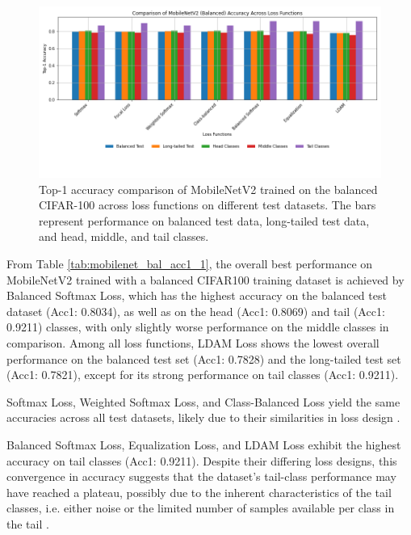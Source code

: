 \begin{figure}[h!]
    \centering
    \includegraphics[width=\textwidth]{Images/Plots/mobilenet_bal_loss_comparison.png}
    \caption{Top-1 accuracy comparison of MobileNetV2 trained on the balanced CIFAR-100 across loss functions on different test datasets. The bars represent performance on balanced test data, long-tailed test data, and head, middle, and tail classes.}
    \label{fig:mobilenet_bal_loss_comparison}
\end{figure}


From Table \ref{tab:mobilenet_bal_acc1_1}, the overall best performance on MobileNetV2 trained with a balanced CIFAR100 training dataset is achieved by Balanced Softmax Loss, which has the highest accuracy on the balanced test dataset (Acc1: 0.8034), as well as on the head (Acc1: 0.8069) and tail (Acc1: 0.9211) classes, with only slightly worse performance on the middle classes in comparison. Among all loss functions, LDAM Loss shows the lowest overall performance on the balanced test set (Acc1: 0.7828) and the long-tailed test set (Acc1: 0.7821), except for its strong performance on tail classes (Acc1: 0.9211). %

Softmax Loss, Weighted Softmax Loss, and Class-Balanced Loss yield the same accuracies across all test datasets, likely due to their similarities in loss design  .

Balanced Softmax Loss, Equalization Loss, and LDAM Loss exhibit the highest accuracy on tail classes (Acc1: 0.9211). Despite their differing loss designs, this convergence in accuracy suggests that the dataset's tail-class performance may have reached a plateau, possibly due to the inherent characteristics of the tail classes, i.e. either noise or the limited number of samples available per class in the tail .

